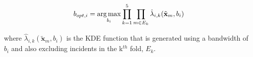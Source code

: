 \documentclass{svjour3}
\begin{document}
\begin{equation}
  \label{eqn:fivefold}
   b_{opt,i} = \operatorname*{arg\,max}_{b_i} \prod_{k=1}^5 \prod_{m \in E_k}   \hat\lambda_{i,k}(\tilde{\textbf{x}}_m,b_i)
\end{equation}

\noindent where $\hat\lambda_{i,k}(\tilde{\textbf{x}}_m,b_i)$ is the KDE function that is generated using a bandwidth of $b_i$ and also excluding incidents in the k$^{th}$ fold, $E_k$. 

\begin{figure}[!htb]
       \begin{center}
          \\ %
\end{center}
\end{figure}
\end{document}
